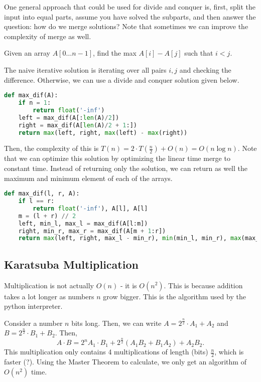 
One general approach that could be used for divide and conquer is, first, split the input into equal parts, assume you have solved the subparts, and then answer the question: how do we merge solutions? Note that sometimes we can improve the complexity of merge as well.

\begin{eg}
	Given an array \( A[0\ldots n-1] \), find the max \( A[i] - A[j] \) such that \( i<j \).
\end{eg}
\begin{explanation}
	The naive iterative solution is iterating over all pairs \( i,j \) and checking the difference. Otherwise, we can use a divide and conquer solution given below.
\end{explanation}

\begin{lstlisting}[language=Python]
def max_dif(A):
	if n = 1:
		return float('-inf')
	left = max_dif(A[:len(A)/2])
	right = max_dif(A[len(A)/2 + 1:])
	return max(left, right, max(left) - max(right))
\end{lstlisting}

Then, the complexity of this is \( T(n) = 2\cdot T(\frac{n}{2}) + O(n) = O(n\log n)\). Note that we can optimize this solution by optimizing the linear time merge to constant time. Instead of returning only the solution, we can return as well the maximum and minimum element of each of the arrays.

\begin{lstlisting}[language=Python]
def max_dif(l, r, A):
	if l == r:
		return float('-inf'), A[l], A[l]
	m = (l + r) // 2
	left, min_l, max_l = max_dif(A[l:m])
	right, min_r, max_r = max_dif(A[m + 1:r])
	return max(left, right, max_l - min_r), min(min_l, min_r), max(max_l, max_r)
\end{lstlisting}

\subsection{Karatsuba Multiplication}

Multiplication is not actually \( O(n) \) - it is \( O(n^{2} ) \). This is because addition takes a lot longer as numbers \( n \) grow bigger. This is the algorithm used by the python interpreter.

Consider a number \( n \) bits long. Then, we can write \( A = 2^{\frac{n}{2}} \cdot A_{1} + A_{2} \) and \( B = 2^{\frac{n}{2}} \cdot B_{1} + B_{2}  \). Then, \[
	A \cdot B = 2^{n} A_{1}\cdot B_{1} + 2^{\frac{n}{2}} (A_{1}B_{2} + B_{1}A_{2}) + A_{2}B_{2} 
.\] This multiplication only contains 4 multiplications of length (bits) \( \frac{n}{2} \), which is faster (?). Using the Master Theorem to calculate, we only get an algorithm of \( O(n^{2} ) \) time.

